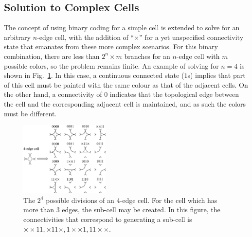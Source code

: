 \documentclass[journal]{IEEEtran}
\begin{document}
\subsection{Solution to Complex Cells}
The concept of using binary coding for a simple cell is extended to solve for an arbitrary $n$-edge cell, 
with the addition of ``$\times$'' for a yet unspecified connectivity state that emanates from these more complex scenarios. 
For this binary combination, there are less than $2^n\times m$ branches for an $n$-edge cell with $m$ possible colors, so the problem remains finite. 
An example of solving for $n=4$ is shown in Fig.~\ref{figeasycell4}.
In this case, a continuous connected state ($1$s) implies that part of this cell must be painted with the same colour as that of the adjacent cells. %
On the other hand, a connectivity of $0$ indicates that the topological edge between the cell and the corresponding adjacent cell is maintained, and as such the colors must be different. 

\begin{figure}[t]
\centering
\includegraphics[width = 0.4\textwidth]{easycell/cell4}
\caption{The $2^4$ possible divisions of an 4-edge cell. For the cell which has more than 3 edges, the sub-cell may be created. In this figure, the connectivities that correspond to generating a sub-cell is $\times\times11, \times11\times, 1\times\times1, 11\times\times$. }\label{figeasycell4}
\end{figure}
\end{document}
